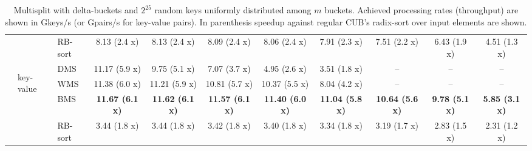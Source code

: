 \begin{table}
{\begin{tabular}{lll cccccccc}
    & & RB-sort
        & 8.13 (2.4 x) &  8.13 (2.4 x) &  8.09 (2.4 x) &  8.06 (2.4 x) &  7.91 (2.3 x) &  7.51 (2.2 x) &  6.43 (1.9 x) &  4.51 (1.3 x) \\ 
\cmidrule{2-11}
    & \multirow{4}{*}{\begin{turn}{90}\tiny key-value\end{turn}} 
    & DMS
        & 11.17 (5.9 x) &  9.75 (5.1 x) &  7.07 (3.7 x) &  4.95 (2.6 x) &  3.51 (1.8 x) & -- & -- & -- \\
    & & WMS 
        & 11.38 (6.0 x) &  11.21 (5.9 x) &  10.81 (5.7 x) &  10.37 (5.5 x) &  8.04 (4.2 x) & -- & -- & -- \\ 
    & & BMS
        & \textbf{11.67 (6.1 x)} &  \textbf{11.62 (6.1 x)} &  \textbf{11.57 (6.1 x)} &  \textbf{11.40 (6.0 x)} &  \textbf{11.04 (5.8 x)} &  \textbf{10.64 (5.6 x)} &  \textbf{9.78 (5.1 x)} &  \textbf{5.85 (3.1 x)}  \\ 
    & & RB-sort
        & 3.44 (1.8 x) &  3.44 (1.8 x) &  3.42 (1.8 x) &  3.40 (1.8 x) &  3.34 (1.8 x) &  3.19 (1.7 x) &  2.83 (1.5 x) &  2.31 (1.2 x) \\  

\bottomrule
\end{tabular}
}
  \caption{Multisplit with delta-buckets and $2^{25}$ random keys uniformly distributed among $m$ buckets. Achieved processing rates (throughput) are shown in Gkeys/s (or Gpairs/s for key-value pairs). In parenthesis speedup against regular CUB's radix-sort over input elements are shown. }\label{table:ms_rate}
\end{table}
